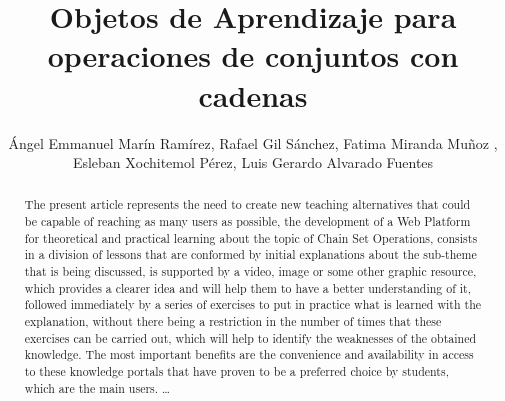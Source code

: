 \documentclass{llncs}
\begin{document}
\title{Objetos de Aprendizaje para operaciones de conjuntos con cadenas}
%
%
\author{Ángel Emmanuel Marín Ramírez, Rafael Gil Sánchez, Fatima Miranda Muñoz , Esleban Xochitemol Pérez, Luis Gerardo Alvarado Fuentes
}
%
%


\maketitle              %

\begin{abstract}
The present article represents the need to create new teaching alternatives that could be capable of reaching as many users as possible, the development of a Web Platform for theoretical and practical learning about the topic of Chain Set Operations, consists in a division of lessons that are conformed by initial explanations about the sub-theme that is being discussed, is supported by a video, image or some other graphic resource, which provides a clearer idea and will help them to have a better understanding of it, followed immediately by a series of exercises to put in practice what is learned with the explanation, without there being a restriction in the number of times that these exercises can be carried out, which will help to identify the weaknesses of the obtained knowledge. The most important benefits are the convenience and availability in access to these knowledge portals that have proven to be a preferred choice by students, which are the main users. \dots

\end{abstract}
%
\end{document}
